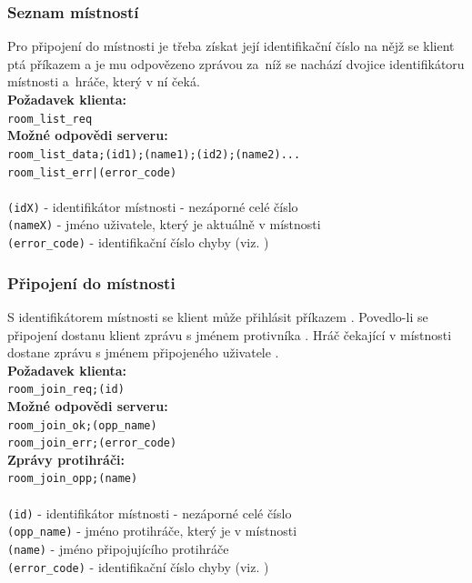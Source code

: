 \documentclass[12pt, a4paper]{article} %
\begin{document}
	\subsubsection{Seznam místností}
	\par Pro připojení do místnosti je třeba získat její identifikační číslo na nějž se klient ptá příkazem  a je mu odpovězeno zprávou  za níž se nachází dvojice identifikátoru místnosti a hráče, který v ní čeká.\\	
	\textbf{Požadavek klienta:}\\
	\texttt{room\_list\_req}\\
	\textbf{Možné odpovědi serveru:}\\
	\texttt{room\_list\_data;(id1);(name1);(id2);(name2)...}\\
	\texttt{room\_list\_err|(error\_code)}\\\\
	\texttt{(idX)} - identifikátor místnosti - nezáporné celé číslo\\
	\texttt{(nameX)} - jméno uživatele, který je aktuálně v místnosti\\
	\texttt{(error\_code)} - identifikační číslo chyby (viz. )
	\subsubsection{Připojení do místnosti}
	\par S identifikátorem místnosti se klient může přihlásit příkazem . Povedlo-li se připojení dostanu klient zprávu s jménem protivníka .  Hráč čekající v místnosti dostane zprávu s jménem připojeného uživatele .\\	
	\textbf{Požadavek klienta:}\\
	\texttt{room\_join\_req;(id)}\\
	\textbf{Možné odpovědi serveru:}\\
	\texttt{room\_join\_ok;(opp\_name)}\\
	\texttt{room\_join\_err;(error\_code)}\\
	\textbf{Zprávy protihráči:}\\
	\texttt{room\_join\_opp;(name)}\\\\
	\texttt{(id)} - identifikátor místnosti - nezáporné celé číslo\\
	\texttt{(opp\_name)} - jméno protihráče, který je v místnosti\\
	\texttt{(name)} - jméno připojujícího protihráče\\
	\texttt{(error\_code)} - identifikační číslo chyby (viz. )
\end{document}
